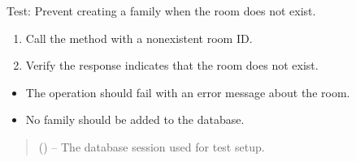 \documentclass[letterpaper,10pt,english]{sphinxmanual}
\begin{document}
\begin{fulllineitems}
\label{\detokenize{test:test.test_family.test_create_family_room_not_exist}}
\pysigstartsignatures
\pysiglinewithargsret
{}
{}
{}
\pysigstopsignatures
\sphinxAtStartPar
Test: Prevent creating a family when the room does not exist.
\begin{description}
\begin{enumerate}
%
\item {} 
\sphinxAtStartPar
Call the  method with a nonexistent room ID.

\item {} 
\sphinxAtStartPar
Verify the response indicates that the room does not exist.

\end{enumerate}

\begin{itemize}
\item {} 
\sphinxAtStartPar
The operation should fail with an error message about the room.

\item {} 
\sphinxAtStartPar
No family should be added to the database.

\end{itemize}

\end{description}
\begin{quote}\begin{description}
\sphinxAtStartPar
{} () – The database session used for test setup.

\end{description}\end{quote}

\end{fulllineitems}

\end{document}
